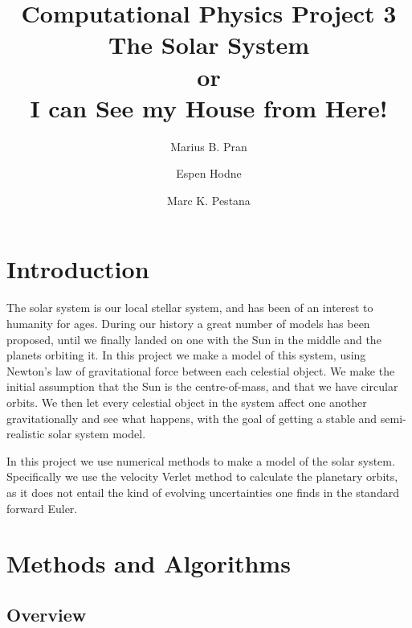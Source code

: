 \documentclass[10pt,showpacs,preprintnumbers,footinbib,amsmath,amssymb,aps,prl,twocolumn,groupedaddress,superscriptaddress,showkeys]{revtex4-1}
\begin{document}
\title[CPP2]{Computational Physics Project 3\\
\large{The Solar System}\\
or\\
I can See my House from Here!}

\author{Marius B. Pran}
\author{Espen Hodne} 
\author{Marc K. Pestana}


\begin{abstract}


\end{abstract}



\maketitle



\section{Introduction}

The solar system is our local stellar system, and has been of an interest to humanity for ages. During our history a great number of models has been proposed, until we finally landed on one with the Sun in the middle and the planets orbiting it. In this project we make a model of this system, using Newton's law of gravitational force between each celestial object. We make the initial assumption that the Sun is the centre-of-mass, and that we have circular orbits. We then let every celestial object in the system affect one another gravitationally and see what happens, with the goal of getting a stable and semi-realistic solar system model.

In this project we use numerical methods to make a model of the solar system. Specifically we use the velocity Verlet method to calculate the planetary orbits, as it does not entail the kind of evolving uncertainties one finds in the standard forward Euler.



\section{Methods and Algorithms}

\subsection{Overview}
\end{document}

